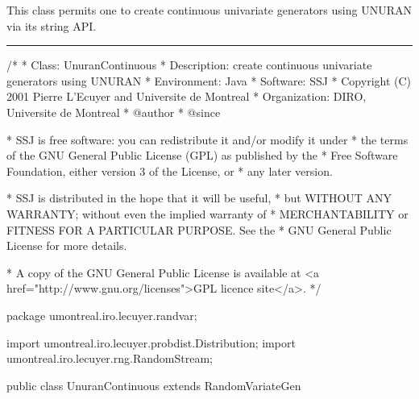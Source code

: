 
This class permits one to create continuous univariate
generators using UNURAN via its string API.

\bigskip\hrule

\begin{code}
\begin{hide}
/*
 * Class:        UnuranContinuous
 * Description:  create continuous univariate generators using UNURAN
 * Environment:  Java
 * Software:     SSJ 
 * Copyright (C) 2001  Pierre L'Ecuyer and Universite de Montreal
 * Organization: DIRO, Universite de Montreal
 * @author       
 * @since

 * SSJ is free software: you can redistribute it and/or modify it under
 * the terms of the GNU General Public License (GPL) as published by the
 * Free Software Foundation, either version 3 of the License, or
 * any later version.

 * SSJ is distributed in the hope that it will be useful,
 * but WITHOUT ANY WARRANTY; without even the implied warranty of
 * MERCHANTABILITY or FITNESS FOR A PARTICULAR PURPOSE.  See the
 * GNU General Public License for more details.

 * A copy of the GNU General Public License is available at
   <a href="http://www.gnu.org/licenses">GPL licence site</a>.
 */
\end{hide}
package umontreal.iro.lecuyer.randvar;\begin{hide}
import umontreal.iro.lecuyer.probdist.Distribution;
import umontreal.iro.lecuyer.rng.RandomStream;
\end{hide}

public class UnuranContinuous extends RandomVariateGen\begin{hide} {

   private RandUnuran unuran = new RandUnuran();
\end{hide}\end{code}

